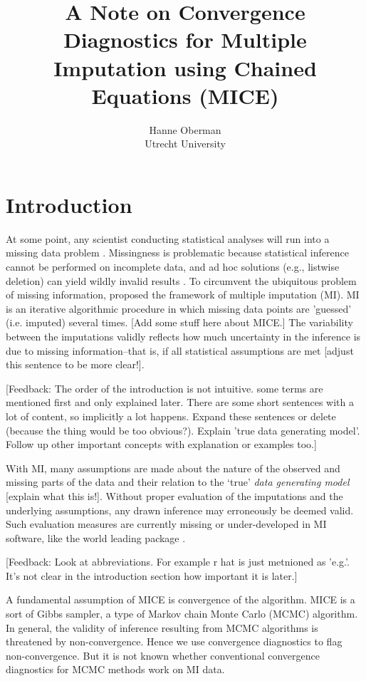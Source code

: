 \documentclass[article]{jss}
\author{Hanne Oberman\\Utrecht University}
\title{A Note on Convergence Diagnostics for Multiple Imputation using Chained Equations (MICE)}
\begin{document}

\section{Introduction} \label{sec:intro} %

At some point, any scientist conducting statistical analyses will run into a missing data problem \citep{alli02}. Missingness is problematic because statistical inference cannot be performed on incomplete data, and ad hoc solutions (e.g., listwise deletion) can yield wildly invalid results \citep{buur18}. To circumvent the ubiquitous problem of missing information, \cite{rubin87} proposed the framework of multiple imputation (MI). MI is an iterative algorithmic procedure in which missing data points are 'guessed' (i.e. imputed) several times. [Add some stuff here about MICE.] The variability between the imputations validly reflects how much uncertainty in the inference is due to missing information--that is, if all statistical assumptions are met \citep{rubin87} [adjust this sentence to be more clear!].

[Feedback: The order of the introduction is not intuitive. some terms are mentioned first and only explained later. There are some short sentences with a lot of content, so implicitly a lot happens. Expand these sentences or delete (because the thing would be too obvious?). Explain 'true data generating model'. Follow up other important concepts with explanation or examples too.]

With MI, many assumptions are made about the nature of the observed and missing parts of the data and their relation to the `true' \emph{data generating model} \citep{buur18} [explain what this is!]. Without proper evaluation of the imputations and the underlying assumptions, any drawn inference may erroneously be deemed valid. Such evaluation measures are currently missing or under-developed in MI software, like the world leading  package  \citep{mice}. %

[Feedback: Look at abbreviations. For example r hat is just metnioned as 'e.g.'. It's not clear in the introduction section how important it is later.]

A fundamental assumption of MICE is convergence of the algorithm. MICE is a sort of Gibbs sampler, a type of Markov chain Monte Carlo (MCMC) algorithm. In general, the validity of inference resulting from MCMC algorithms is threatened by non-convergence. Hence we use convergence diagnostics to flag non-convergence. But it is not known whether conventional convergence diagnostics for MCMC methods work on MI data. 
\end{document}
